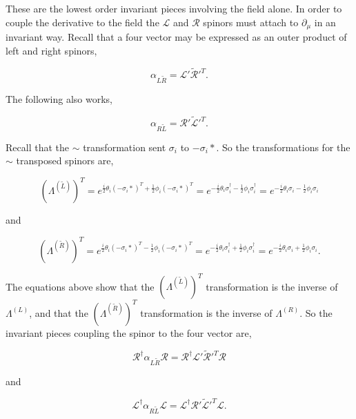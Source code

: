 These are the lowest order invariant pieces involving the field alone. In order to couple the derivative to the field the $\mathcal{L}$ and $\mathcal{R}$ spinors must attach to $\partial_\mu$ in an invariant way. Recall that a four vector may be expressed as an outer product of left and right spinors, 

\begin{equation}
\alpha_{L\tilde{R}} = \mathcal{L}' \tilde{\mathcal{R}}'^{T}.
\end{equation}

The following also works, 

\begin{equation}
\alpha_{R\tilde{L}} = \mathcal{R}' \tilde{\mathcal{L}}'^{T}.
\end{equation}

Recall that the $\sim$ transformation sent $\sigma_i$ to $-\sigma_i*$. So the transformations for the $\sim$ transposed spinors are,

\begin{equation}
(\Lambda^{(\tilde{L})})^T = e^{\frac{i}{2}\theta_i(-\sigma_i*)^T + \frac{1}{2}\phi_i (-\sigma_i*)^T} 
= e^{-\frac{i}{2}\theta_i \sigma_i^\dagger - \frac{1}{2}\phi_i \sigma_i^\dagger} = e^{-\frac{i}{2}\theta_i \sigma_i - \frac{1}{2}\phi_i \sigma_i}
\end{equation}

and

\begin{equation}
(\Lambda^{(\tilde{R})})^T = e^{\frac{i}{2}\theta_i(-\sigma_i*)^T - \frac{1}{2}\phi_i (-\sigma_i*)^T} 
= e^{-\frac{i}{2}\theta_i \sigma_i^\dagger + \frac{1}{2}\phi_i \sigma_i^\dagger} = e^{-\frac{i}{2}\theta_i \sigma_i + \frac{1}{2}\phi_i \sigma_i}.
\end{equation}

The equations above show that the $(\Lambda^{(\tilde{L})})^T$ transformation is the inverse of $\Lambda^{(L)}$, and that the $(\Lambda^{(\tilde{R})})^T$ transformation is the inverse of $\Lambda^{(R)}$. So the invariant pieces coupling the spinor to the four vector are,

\begin{equation}
\mathcal{R}^\dagger \alpha_{L\tilde{R}} \mathcal{R} = \mathcal{R}^\dagger \mathcal{L}' \tilde{\mathcal{R}}'^{T} \mathcal{R}
\end{equation}

and

\begin{equation}
\mathcal{L}^\dagger \alpha_{R\tilde{L}} \mathcal{L} = \mathcal{L}^\dagger \mathcal{R}' \tilde{\mathcal{L}}'^{T} \mathcal{L}.
\end{equation}

